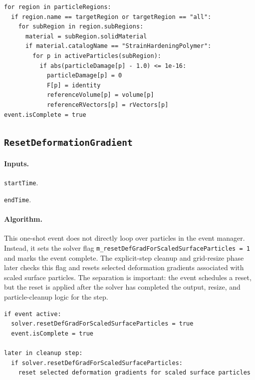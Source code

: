 \begin{lstlisting}[caption={PolymerHeal event pseudocode.}]
for region in particleRegions:
  if region.name == targetRegion or targetRegion == "all":
    for subRegion in region.subRegions:
      material = subRegion.solidMaterial
      if material.catalogName == "StrainHardeningPolymer":
        for p in activeParticles(subRegion):
          if abs(particleDamage[p] - 1.0) <= 1e-16:
            particleDamage[p] = 0
            F[p] = identity
            referenceVolume[p] = volume[p]
            referenceRVectors[p] = rVectors[p]
event.isComplete = true
\end{lstlisting}

\subsection{\texttt{ResetDeformationGradient}}
\label{subsec:event-reset-deformation-gradient}

\paragraph{Inputs.}
\begin{description}[leftmargin=*,style=nextline]
\item[\textbf{Required.}] \texttt{startTime}.
\item[\textbf{Optional.}] \texttt{endTime}.
\end{description}

\paragraph{Algorithm.}
This one-shot event does not directly loop over particles in the event manager.  Instead, it sets the solver flag \texttt{m\_resetDefGradForScaledSurfaceParticles = 1} and marks the event complete.  The explicit-step cleanup and grid-resize phase later checks this flag and resets selected deformation gradients associated with scaled surface particles.  The separation is important: the event schedules a reset, but the reset is applied after the solver has completed the output, resize, and particle-cleanup logic for the step.

\begin{lstlisting}[caption={ResetDeformationGradient event pseudocode.}]
if event active:
  solver.resetDefGradForScaledSurfaceParticles = true
  event.isComplete = true

later in cleanup step:
  if solver.resetDefGradForScaledSurfaceParticles:
    reset selected deformation gradients for scaled surface particles
\end{lstlisting}

